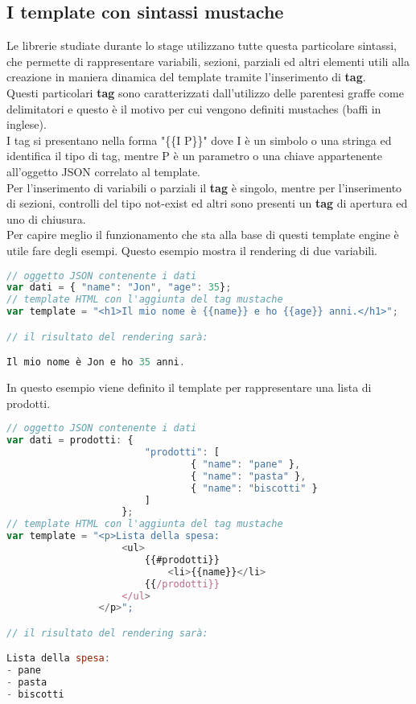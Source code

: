 \subsection{I template con sintassi mustache}
Le librerie studiate durante lo stage utilizzano tutte questa particolare sintassi, che permette di rappresentare variabili, sezioni, parziali ed altri elementi utili alla creazione in maniera dinamica del template tramite l'inserimento di \textbf{tag}.\\
Questi particolari \textbf{tag} sono caratterizzati dall'utilizzo delle parentesi graffe come delimitatori e questo è il motivo per cui vengono definiti mustaches (baffi in inglese).\\
I tag si presentano nella forma "\{\{I P\}\}" dove I è un simbolo o una stringa ed identifica il tipo di tag, mentre P è un parametro o una chiave appartenente all'oggetto JSON correlato al template.\\
Per l'inserimento di variabili o parziali il \textbf{tag} è singolo, mentre per l'inserimento di sezioni, controlli del tipo not-exist ed altri sono presenti un \textbf{tag} di apertura ed uno di chiusura.\\
Per capire meglio il funzionamento che sta alla base di questi template engine è utile fare degli esempi.
\newpage
Questo esempio mostra il rendering di due variabili.
\begin{lstlisting}[language=JavaScript, caption=Esempio di template rappresentante una variabile.]
// oggetto JSON contenente i dati
var dati = { "name": "Jon", "age": 35};
// template HTML con l'aggiunta del tag mustache
var template = "<h1>Il mio nome è {{name}} e ho {{age}} anni.</h1>";

// il risultato del rendering sarà:

Il mio nome è Jon e ho 35 anni.
\end{lstlisting}
In questo esempio viene definito il template per rappresentare una lista di prodotti.
\begin{lstlisting}[language=JavaScript, caption=Esempio di template rappresentante una sezione.]
// oggetto JSON contenente i dati
var dati = prodotti: { 
						"prodotti": [
    							{ "name": "pane" },
    							{ "name": "pasta" },
    							{ "name": "biscotti" }
  						]
					};
// template HTML con l'aggiunta del tag mustache
var template = "<p>Lista della spesa:
					<ul>
						{{#prodotti}}
							<li>{{name}}</li>
						{{/prodotti}}
					</ul>
				</p>";

// il risultato del rendering sarà:

Lista della spesa:
- pane
- pasta
- biscotti
\end{lstlisting}

